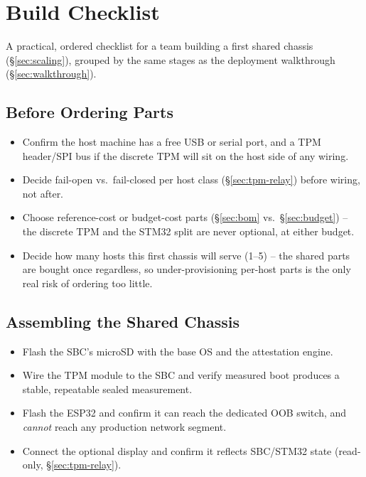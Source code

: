 \documentclass[11pt,a4paper]{article}
\begin{document}
\section{Build Checklist}
\label{sec:checklist}

A practical, ordered checklist for a team building a first shared
chassis (\S\ref{sec:scaling}), grouped by the same stages as the
deployment walkthrough (\S\ref{sec:walkthrough}).

\subsection{Before Ordering Parts}

\begin{itemize}[label=$\square$]
  \item Confirm the host machine has a free USB or serial port, and a
    TPM header/SPI bus if the discrete TPM will sit on the host side of
    any wiring.
  \item Decide fail-open vs.\ fail-closed per host class
    (\S\ref{sec:tpm-relay}) before wiring, not after.
  \item Choose reference-cost or budget-cost parts (\S\ref{sec:bom}
    vs.\ \S\ref{sec:budget}) -- the discrete TPM and the STM32 split
    are never optional, at either budget.
  \item Decide how many hosts this first chassis will serve (1--5) --
    the shared parts are bought once regardless, so under-provisioning
    per-host parts is the only real risk of ordering too little.
\end{itemize}

\subsection{Assembling the Shared Chassis}

\begin{itemize}[label=$\square$]
  \item Flash the SBC's microSD with the base OS and the attestation
    engine.
  \item Wire the TPM module to the SBC and verify measured boot
    produces a stable, repeatable sealed measurement.
  \item Flash the ESP32 and confirm it can reach the dedicated OOB
    switch, and \emph{cannot} reach any production network segment.
  \item Connect the optional display and confirm it reflects SBC/STM32
    state (read-only, \S\ref{sec:tpm-relay}).
\end{itemize}
\end{document}
